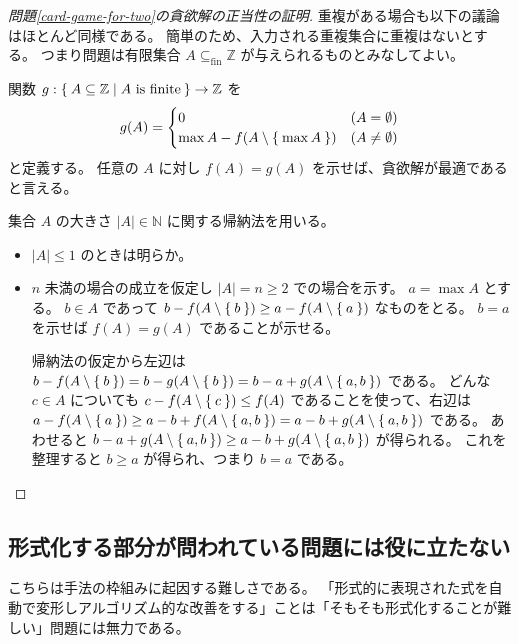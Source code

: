 \documentclass{ltjsarticle}
\begin{document}
\begin{proof}[問題\ref{card-game-for-two}の貪欲解の正当性の証明]
    重複がある場合も以下の議論はほとんど同様である。
    簡単のため、入力される重複集合に重複はないとする。
    つまり問題は有限集合 $A \subseteq_\mathrm{fin} \mathbb{Z}$ が与えられるものとみなしてよい。

    関数 $g : \Set{ A \subseteq \mathbb{Z} \mid A \text{~is finite} } \to \mathbb{Z}$ を
    \[
        g(A) = \begin{cases}
            0 & (A = \emptyset) \\
            \max A - f(A \setminus \Set{ \max A }) & (A \ne \emptyset)
        \end{cases}
    \] と定義する。
    任意の $A$ に対し $f(A) = g(A)$ を示せば、貪欲解が最適であると言える。

    集合 $A$ の大きさ $\lvert A \rvert \in \mathbb{N}$ に関する帰納法を用いる。
    \begin{itemize}
        \item $\lvert A \rvert \le 1$ のときは明らか。
        \item $n$ 未満の場合の成立を仮定し $\lvert A \rvert = n \ge 2$ での場合を示す。
            $a = \max A$ とする。
            $b \in A$ であって $b - f(A \setminus \Set{ b }) \ge a - f(A \setminus \Set{ a })$ なものをとる。
            $b = a$ を示せば $f(A) = g(A)$ であることが示せる。

            帰納法の仮定から左辺は $b - f(A \setminus \Set{ b }) = b - g(A \setminus \Set{ b }) = b - a + g(A \setminus \Set{ a, b })$ である。
            どんな $c \in A$ についても $c - f(A \setminus \Set{ c }) \le f(A)$ であることを使って、右辺は $a - f(A \setminus \Set{ a }) \ge a - b + f(A \setminus \Set{ a, b }) = a - b + g(A \setminus \Set{ a, b })$ である。
            あわせると $b - a + g(A \setminus \Set{ a, b }) \ge a - b + g(A \setminus \Set{ a, b })$ が得られる。
            これを整理すると $b \ge a$ が得られ、つまり $b = a$ である。
    \end{itemize}
\end{proof}

\subsection{形式化する部分が問われている問題には役に立たない}

こちらは手法の枠組みに起因する難しさである。
「形式的に表現された式を自動で変形しアルゴリズム的な改善をする」ことは「そもそも形式化することが難しい」問題には無力である。
\end{document}
